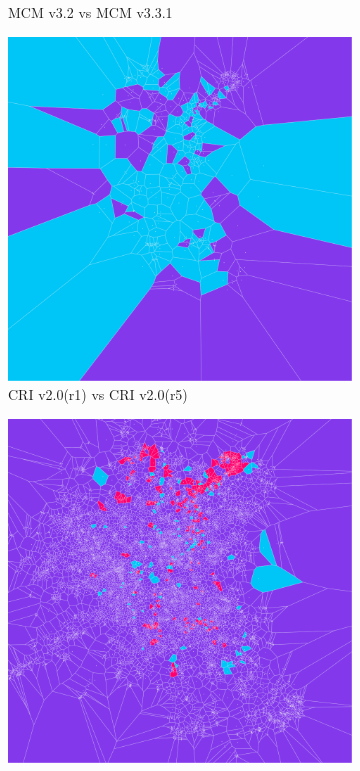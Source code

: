 \begin{figure}[H]
\begin{subfigure}[b]{.49\textwidth}
         \caption{MCM v3.2 vs MCM v3.3.1}
         \label{fig:m2to3}
     \end{subfigure}
    \begin{subfigure}[b]{.49\textwidth}
         \centering \includegraphics[width=\textwidth]{cr1_cr5.png}
         \caption{CRI v2.0(r1) vs CRI v2.0(r5)}
         \label{fig:cr1tocr5}
     \end{subfigure}
         \begin{subfigure}[b]{.49\textwidth}
         \centering \includegraphics[width=\textwidth]{cr1_m32.png}

\end{subfigure}
\end{figure}
